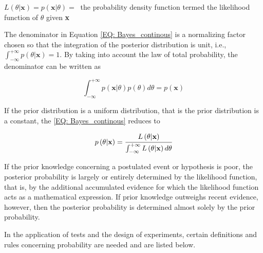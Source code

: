 \documentclass[a4paper,fleqn]{cas-dc}
\begin{document}
$L\left( \theta|\textbf{x} \right) = p\left( \textbf{x}|\theta \right) = ~$ the probability density function termed the likelihood function of $\theta$ given \textbf{x}

The denominator in Equation \ref{EQ: Bayes_continous} is a normalizing factor chosen so that the integration of the posterior distribution is unit, i.e., $\int_{-\infty}^{+\infty} p\left( \theta|\textbf{x} \right) = 1$. By taking into account the law of total probability, the denominator can be written as

\begin{equation}
	\int_{-\infty}^{+\infty} p\left( \textbf{x}|\theta \right) p(\theta) d\theta = p(\textbf{x})
\end{equation}

If the prior distribution is a uniform distribution, that is the prior distribution is a constant, the \ref{EQ: Bayes_continous} reduces to 

\begin{equation}
	p\left( \theta|\textbf{x} \right) = \cfrac{L\left( \theta|\textbf{x} \right)}{\int_{-\infty}^{+\infty} L\left( \theta|\textbf{x}\right) d\theta}
\end{equation}

If the prior knowledge concerning a postulated event or hypothesis is poor, the posterior probability is largely or entirely determined by the likelihood function, that is, by the additional accumulated evidence for which the likelihood function acts as a mathematical expression. If prior knowledge outweighs recent evidence, however, then the posterior probability is determined almost solely by the prior probability.

In the application of tests and the design of experiments, certain definitions and rules concerning probability are needed and are listed below.
\end{document}
